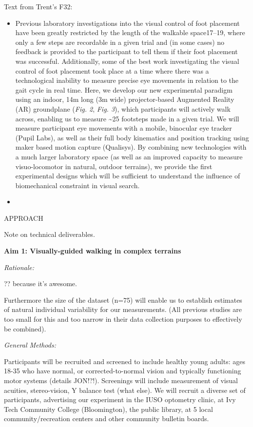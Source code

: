 \documentclass[
]{article}
\providecommand{\tightlist}{%
  \setlength{\itemsep}{0pt}\setlength{\parskip}{0pt}}
\begin{document}
Text from Trent's F32:

\begin{itemize}
\item
  Previous laboratory investigations into the visual control of foot
  placement have been greatly restricted by the length of the walkable
  space17--19, where only a few steps are recordable in a given trial
  and (in some cases) no feedback is provided to the participant to tell
  them if their foot placement was successful. Additionally, some of the
  best work investigating the visual control of foot placement took
  place at a time where there was a technological inability to measure
  precise eye movements in relation to the gait cycle in real time.
  Here, we develop our new experimental paradigm using an indoor, 14m
  long (3m wide) projector-based Augmented Reality (AR) groundplane
  (\emph{Fig. 2}, \emph{Fig. 3}), which participants will actively walk
  across, enabling us to measure \textasciitilde25 footsteps made in a
  given trial. We will measure participant eye movements with a mobile,
  binocular eye tracker (Pupil Labs), as well as their full body
  kinematics and position tracking using maker based motion capture
  (Qualisys). By combining new technologies with a much larger
  laboratory space (as well as an improved capacity to measure
  visuo-locomotor in natural, outdoor terrains), we provide the first
  experimental designs which will be sufficient to understand the
  influence of biomechanical constraint in visual search.
\end{itemize}

\begin{itemize}
\tightlist
\item
\end{itemize}

APPROACH

Note on technical deliverables.

\textbf{Aim 1: Visually-guided walking in complex terrains}

\emph{Rationale:}

?? because it's awesome.

Furthermore the size of the dataset (n=75) will enable us to establish
estimates of natural individual variability for our measurements. (All
previous studies are too small for this and too narrow in their data
collection purposes to effectively be combined).

\emph{General Methods:}

Participants will be recruited and screened to include healthy young
adults: ages 18-35 who have normal, or corrected-to-normal vision and
typically functioning motor systems (details JON!?!). Screenings will
include measurement of visual acuities, stereo-vision, Y balance test
(what else). We will recruit a diverse set of participants, advertising
our experiment in the IUSO optometry clinic, at Ivy Tech Community
College (Bloomington), the public library, at 5 local
community/recreation centers and other community bulletin boards.
\end{document}
